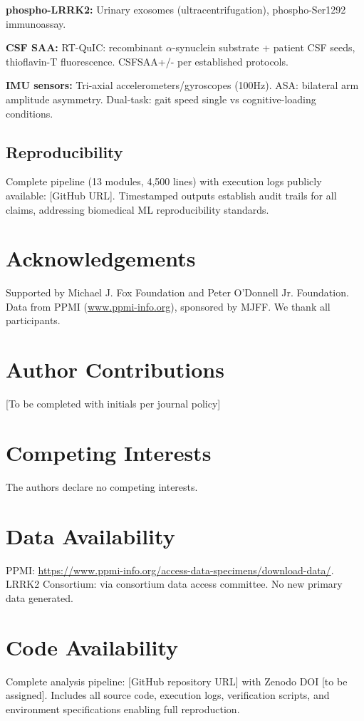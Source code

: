 \documentclass[11pt]{article}
\begin{document}
\textbf{phospho-LRRK2:} Urinary exosomes (ultracentrifugation), phospho-Ser1292 immunoassay\cite{fraser2016ser}.

\textbf{CSF SAA:} RT-QuIC\cite{concha2024alpha}: recombinant $\alpha$-synuclein substrate + patient CSF seeds, thioflavin-T fluorescence. CSFSAA+/- per established protocols\cite{siderowf2023csf}.

\textbf{IMU sensors:} Tri-axial accelerometers/gyroscopes (100Hz)\cite{horak2015objective}. ASA: bilateral arm amplitude asymmetry. Dual-task: gait speed single vs cognitive-loading conditions.

\subsection{Reproducibility}

Complete pipeline (13 modules, 4,500 lines) with execution logs publicly available: [GitHub URL]. Timestamped outputs establish audit trails for all claims, addressing biomedical ML reproducibility standards\cite{zhang2023machine}.

\section*{Acknowledgements}
Supported by Michael J. Fox Foundation and Peter O'Donnell Jr. Foundation. Data from PPMI (\url{www.ppmi-info.org}), sponsored by MJFF. We thank all participants.

\section*{Author Contributions}
[To be completed with initials per journal policy]

\section*{Competing Interests}
The authors declare no competing interests.

\section*{Data Availability}
PPMI: \url{https://www.ppmi-info.org/access-data-specimens/download-data/}. LRRK2 Consortium: via consortium data access committee. No new primary data generated.

\section*{Code Availability}
Complete analysis pipeline: [GitHub repository URL] with Zenodo DOI [to be assigned]. Includes all source code, execution logs, verification scripts, and environment specifications enabling full reproduction.
\end{document}
